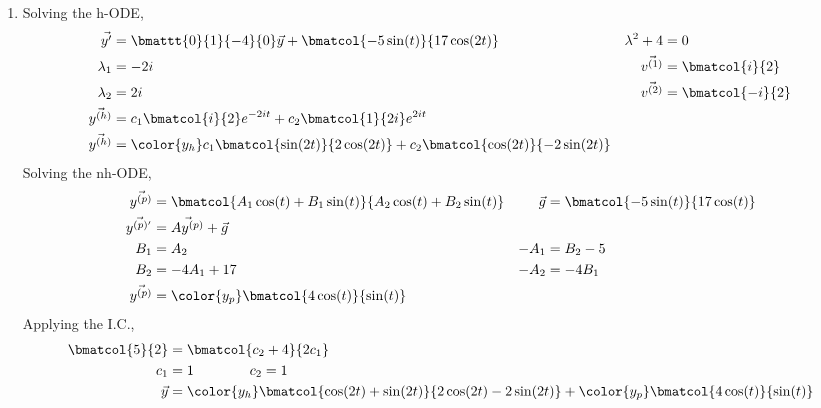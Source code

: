 \begin{enumerate}
    \item Solving the h-ODE,
          \begin{align}
              \vec{y'}                          & = \bmattt{0}{1}{-4}{0} \vec{y}
              + \bmatcol{-5\sin(t)}{17\cos(2t)} &
              \lambda^{2} + 4                   & = 0                              \\
              \lambda_1                         & = -2i                          &
              \vec{v^{(1)}}                     & = \bmatcol{i}{2}                 \\
              \lambda_2                         & = 2i                           &
              \vec{v^{(2)}}                     & = \bmatcol{-i}{2}                \\
              \vec{y^{(h)}}                     & = c_1 \bmatcol{i}{2}e^{-2it}
              + c_2 \bmatcol{1}{2i} e^{2it}                                        \\
              \vec{y^{(h)}}                     & = \color{y_h}
              c_1 \bmatcol{\sin(2t)}{2\cos(2t)}
              + c_2 \bmatcol{\cos(2t)}{-2\sin(2t)}
          \end{align}
          Solving the nh-ODE,
          \begin{align}
              \vec{y^{(p)}}             & = \bmatcol{A_1\cos(t) + B_1\sin(t)}
              {A_2\cos(t) + B_2\sin(t)} &
              \vec{g}                   & = \bmatcol{-5 \sin(t)}{17 \cos(t)}    \\
              \vec{y^{(p)'}}            & = \vec{Ay^{(p)}} + \vec{g}            \\
              B_1                       & = A_2                               &
              -A_1                      & = B_2 - 5                             \\
              B_2                       & = -4A_1 + 17                        &
              -A_2                      & = -4B_1                               \\
              \vec{y^{(p)}}             & = \color{y_p}
              \bmatcol{4\cos(t)}{\sin(t)}
          \end{align}
          Applying the I.C.,
          \begin{align}
              \bmatcol{5}{2} & = \bmatcol{c_2 + 4}
              {2c_1}                                    \\
              c_1            & = 1 \qquad\qquad c_2 = 1 \\
              \vec{y}        & = {\color{y_h}
              \bmatcol{\cos(2t) + \sin(2t)}{2\cos(2t) - 2\sin(2t)}}
              + {\color{y_p} \bmatcol{4\cos(t)}{\sin(t)}}
          \end{align}


\end{enumerate}
